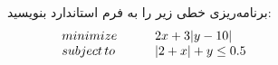 برنامه‌ریزی خطی زیر را به فرم استاندارد بنویسید:
\[
    \begin{array}{l l}
        minimize            & \hspace*{20pt} 2 x + 3|y - 10| \hspace*{140pt} \\
        subject\,to         & \hspace*{20pt} |2 + x| + y \leq 0.5 
    \end{array}
\]